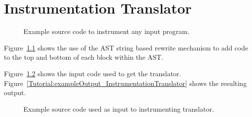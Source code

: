 \chapter{Instrumentation Translator}


\begin{figure}[!ht]
{\indent
{\mySmallFontSize


\begin{latexonly}
   
\end{latexonly}

\begin{htmlonly}
   
\end{htmlonly}

}
}
\caption{Example source code to instrument any input program.}
\label{Tutorial:exampleInstrumentationTranslator}
\end{figure}

    Figure~\ref{Tutorial:exampleInstrumentationTranslator} shows the use of
the AST string based rewrite mechanism to add code to the top and bottom of 
each block within the AST.

   Figure~\ref{Tutorial:exampleInputCode_InstrumentationTranslator} shows the
input code used to get the translator.
Figure~\ref{Tutorial:exampleOutput_InstrumentationTranslator} shows the resulting output.

\begin{figure}[!ht]
{\indent
{\mySmallFontSize


\begin{latexonly}
   
\end{latexonly}

\begin{htmlonly}
   
\end{htmlonly}

}
}
\caption{Example source code used as input to instrumenting translator.}
\label{Tutorial:exampleInputCode_InstrumentationTranslator}
\end{figure}

